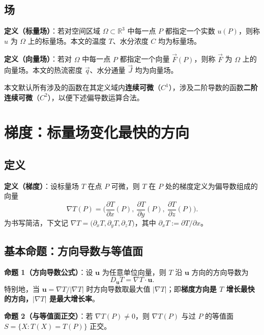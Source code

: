 \documentclass[12pt,a4paper]{ctexart}
\begin{document}
\subsection{场}

\textbf{定义（标量场）}：若对空间区域 $\Omega\subset\mathbb{R}^3$ 中每一点 $P$ 都指定一个实数 $u(P)$，则称 $u$ 为 $\Omega$ 上的标量场。本文的温度 $T$、水分浓度 $C$ 均为标量场。

\textbf{定义（向量场）}：若对 $\Omega$ 中每一点 $P$ 都指定一个向量 $\vec{F}(P)$，则称 $\vec{F}$ 为 $\Omega$ 上的向量场。本文的热流密度 $\vec{q}$、水分通量 $\vec{J}$ 均为向量场。

本文默认所有涉及的函数在其定义域内\textbf{连续可微}（$C^1$），涉及二阶导数的函数\textbf{二阶连续可微}（$C^2$），以便下述偏导数运算合法。

\section{梯度：标量场变化最快的方向}

\subsection{定义}
\label{def:grad}

\textbf{定义（梯度）}：设标量场 $T$ 在点 $P$ 可微，则 $T$ 在 $P$ 处的梯度定义为偏导数组成的向量
\begin{equation}
\nabla T(P)=\Big(\frac{\partial T}{\partial x}(P),\ \frac{\partial T}{\partial y}(P),\ \frac{\partial T}{\partial z}(P)\Big).
\label{eq:grad}
\end{equation}
为书写简洁，下文记 $\nabla T=\big(\partial_x T,\partial_y T,\partial_z T\big)$，其中 $\partial_x T:=\partial T/\partial x$。

\subsection{基本命题：方向导数与等值面}

\textbf{命题 1（方向导数公式）}：设 $\boldsymbol u$ 为任意单位向量，则 $T$ 沿 $\boldsymbol u$ 方向的方向导数为
\begin{equation}
D_{\boldsymbol u}T=\nabla T\cdot\boldsymbol u.
\end{equation}
特别地，当 $\boldsymbol u=\nabla T/|\nabla T|$ 时方向导数取最大值 $|\nabla T|$；即\textbf{梯度方向是 $T$ 增长最快的方向，$|\nabla T|$ 是最大增长率}。

\textbf{命题 2（与等值面正交）}：若 $\nabla T(P)\neq 0$，则 $\nabla T(P)$ 与过 $P$ 的等值面 $S=\{X:T(X)=T(P)\}$ 正交。
\end{document}
